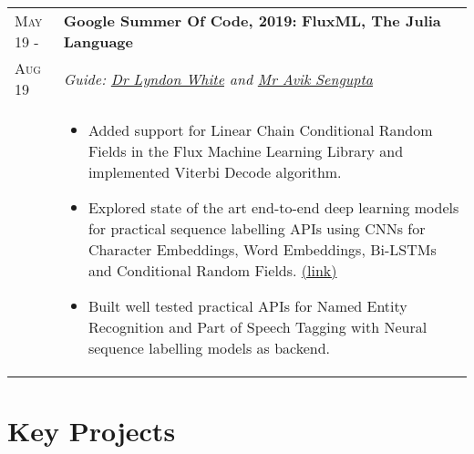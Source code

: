 \documentclass[a4paper,10pt]{extarticle} %
\begin{document}
\begin{tabularx}{\linewidth}{ l | X }

\textsc{May 19 -} & \textbf{Google Summer Of Code, 2019:} \hfill\textbf{FluxML, The Julia Language}\\
    \textsc{Aug 19}& {\textit{Guide: \href{https://www.linkedin.com/in/lyndon-white-46b9a035/}{Dr Lyndon White} and \href{https://www.linkedin.com/in/aviks}{Mr Avik Sengupta}}} \\
    & \begin{itemize}[leftmargin=.1in]
        \item Added support for Linear Chain Conditional Random Fields in the Flux Machine Learning Library and implemented Viterbi Decode algorithm.
        \item Explored state of the art end-to-end deep learning models for practical sequence labelling APIs using CNNs for Character Embeddings, Word Embeddings, Bi-LSTMs and Conditional Random Fields. \href{https://github.com/Ayushk4/NER.jl/tree/master/Sequence_models}{(link)}
        \item Built well tested practical APIs for Named Entity Recognition and Part of Speech Tagging with Neural sequence labelling models as backend.
    \end{itemize}
\end{tabularx}

\vspace{-0.3cm}
\section{\textcolor{primary}{Key Projects}}
\end{document}
